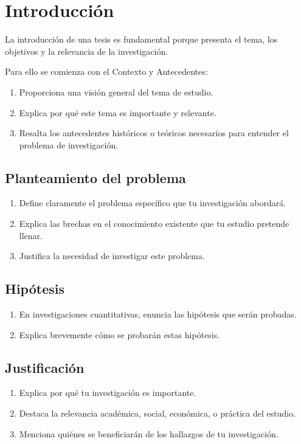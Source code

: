 \chapter{Introducción}

La introducción de una tesis es fundamental porque presenta el tema, los objetivos y la relevancia de la investigación.

Para ello se comienza con el Contexto y Antecedentes:

\begin{enumerate}
    \item Proporciona una visión general del tema de estudio.
    \item Explica por qué este tema es importante y relevante.
    \item Resalta los antecedentes históricos o teóricos necesarios para entender el problema de investigación.
\end{enumerate}

\section{Planteamiento del problema}

\begin{enumerate}
    \item Define claramente el problema específico que tu investigación abordará.
    \item Explica las brechas en el conocimiento existente que tu estudio pretende llenar.
    \item Justifica la necesidad de investigar este problema.
\end{enumerate}

\section{Hipótesis}

\begin{enumerate}
    \item En investigaciones cuantitativas, enuncia las hipótesis que serán probadas.
    \item Explica brevemente cómo se probarán estas hipótesis.
\end{enumerate}

\section{Justificación}

\begin{enumerate}
    \item Explica por qué tu investigación es importante.
    \item Destaca la relevancia académica, social, económica, o práctica del estudio.
    \item Menciona quiénes se beneficiarán de los hallazgos de tu investigación.
\end{enumerate}

